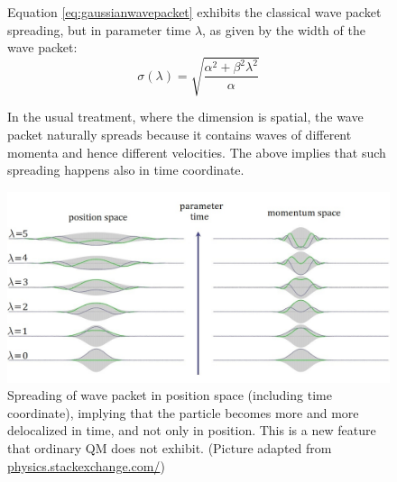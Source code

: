 \documentclass[twoside,a4paper,11pt]{article}
\numberwithin{equation}{section}
\begin{document}
\begin{figure}[H]
   \begin{minipage}[H]{0.34\textwidth}
	\justify
    Equation \ref{eq:gaussianwavepacket} exhibits the classical wave packet spreading, but in parameter time $\lambda$, as given by the width of the wave packet:
\begin{equation}
    \sigma(\lambda) = \sqrt{\frac{ \alpha^2 + \beta^2 \lambda^2}{ \alpha}}
    \label{eq:spreadingwidth}
\end{equation}
 
In the usual treatment, where the dimension is spatial, the wave packet naturally spreads because it contains waves of different momenta and hence different velocities. The above implies that such spreading happens also in time coordinate.
  \end{minipage}
  \hfill
  \begin{minipage}[H]{0.64\textwidth}
    \centering
    \includegraphics[width=1.0\textwidth]{Pics/position_spread.jpg}
    \caption{Spreading of wave packet in position space (including time coordinate), implying that the particle becomes more and more delocalized in time, and not only in position. This is a new feature that ordinary QM does not exhibit. (Picture adapted from \url{physics.stackexchange.com/})}
    \label{picpositionspread}
\end{minipage}
\end{figure}
\end{document}
